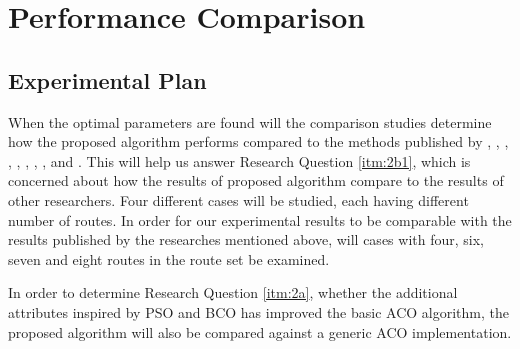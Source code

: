 \section{Performance Comparison}
\label{sec:performanceComparison}
\subsection{Experimental Plan}
When the optimal parameters are found will the comparison studies determine how the proposed algorithm performs compared to the methods published by \citet{mandl79}, \citet{kechagiopoulos14}, \citet{nikolic14}, \citet{kidwai98}, \citet{fan10}, \citet{chakroborty02}, \citet{zhang10}, \citet{chew12}, and \citet{baaj91}. This will help us answer Research Question \vref{itm:2b1}, which is concerned about how the results of proposed algorithm compare to the results of other researchers. Four different cases will be studied, each having different number of routes. In order for our experimental results to be comparable with the results published by the researches mentioned above, will cases with four, six, seven and eight routes in the route set be examined.

In order to determine Research Question \vref{itm:2a}, whether the additional attributes inspired by PSO and BCO has improved the basic ACO algorithm, the proposed algorithm will also be compared against a generic ACO implementation.


